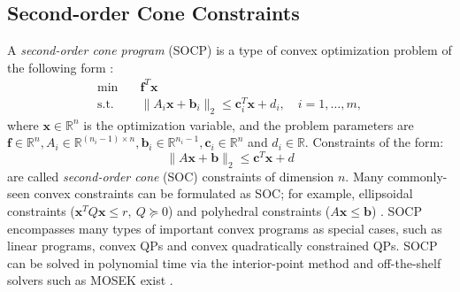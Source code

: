 \documentclass[journal,10pt]{IEEEtran}
\newcommand{\vect}[1]{\boldsymbol{\mathbf{#1}}}
\newcommand{\R}{\mathbb{R}}
\newif\ifdraft
\newcommand{\XX}[1]{\ifdraft{\color{red}[{\bf XX}: #1]}\fi}
\newcommand{\VF}[1]{\ifdraft{\color{blue}[{\bf VF}: #1]}\fi}
\begin{document}

\subsection{Second-order Cone Constraints} \label{SOC_OPT} 
A \emph{second-order cone program} (SOCP) is a type of convex optimization problem of the following form \cite{lobo1998applications,alizadeh2003second,boyd2004convex}: 
\begin{align} \label{SOCP_form}
    \min \quad & \vect{f}^T\vect{x}\\
    \text{s.t.}\quad &\|A_i\vect{x}+\vect{b}_i\|_2\leq \vect{c}_i^T\vect{x}+d_i, \quad i=1,\ldots,m,\nonumber
\end{align}
where $\vect{x}\in\mathbb{R}^n$ is the optimization variable, and the problem parameters are $\vect{f}\in\R^n,A_i\in\mathbb{R}^{(n_i-1)\times n},\vect{b}_i\in\R^{n_i-1},\vect{c}_i\in\R^{n}$ 
and $d_i\in\R$. Constraints of the form:
\begin{equation} \label{SOC}
    \|A\vect{x}+\vect{b}\|_2\leq \vect{c}^T\vect{x}+d
\end{equation}
are called \emph{second-order cone} (SOC) constraints  of dimension $n$. Many commonly-seen convex constraints can be formulated as SOC; for example, ellipsoidal constraints ($\vect{x}^TQ\vect{x} \leq r,\ Q\succeq0$) and polyhedral constraints ($A\vect{x}\leq \vect{b}$) \cite{lobo1998applications,alizadeh2003second,boyd2004convex}. SOCP encompasses many types of important convex programs as special cases, such as linear programs, convex QPs and convex quadratically constrained QPs. SOCP can be solved in polynomial time via the interior-point
method and off-the-shelf solvers such as MOSEK exist \cite{potra2000interior,mosek}.

\end{document}
